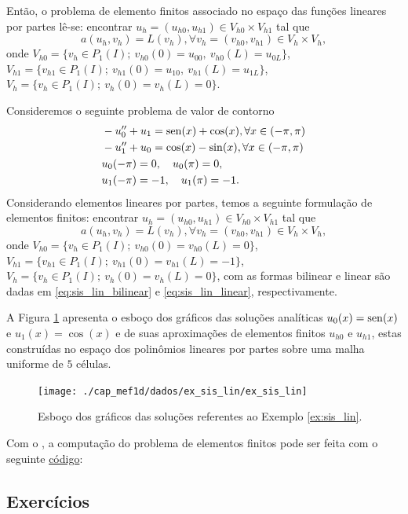 Então, o problema de elemento finitos associado no espaço das funções lineares por partes lê-se: encontrar $u_h = (u_{h0}, u_{h1})\in V_{h0}\times V_{h1}$ tal que
\begin{equation}
  a(u_h, v_h) = L(v_h), \forall v_h = (v_{h0}, v_{h1})\in V_h\times V_h,
\end{equation}
onde $V_{h0} = \{v_h\in P_1(I);~v_{h0}(0)=u_{00},~v_{h0}(L)=u_{0L}\}$, $V_{h1}=\{v_{h1}\in P_1(I);~v_{h1}(0)=u_{10},~v_{h1}(L)=u_{1L}\}$, $V_h = \{v_h\in P_1(I);~v_h(0)=v_h(L)=0\}$.

\begin{ex}\label{ex:sis_lin}
  Consideremos o seguinte problema de valor de contorno
\begin{align}
  &-u_0'' + u_1 = \operatorname{sen}(x)+\cos(x),\forall x\in (-\pi, \pi)\\ 
  &-u_1'' + u_0 = \cos(x)-\sin(x),\forall x\in (-\pi, \pi)\\
  &u_0(-\pi)=0,\quad u_0(\pi)=0,\\
  &u_1(-\pi)=-1,\quad u_1(\pi)=-1.
\end{align}
Considerando elementos lineares por partes, temos a seguinte formulação de elementos finitos: encontrar $u_h = (u_{h0}, u_{h1})\in V_{h0}\times V_{h1}$ tal que
\begin{equation}
  a(u_h, v_h) = L(v_h), \forall v_h = (v_{h0}, v_{h1})\in V_h\times V_h,
\end{equation}
onde $V_{h0} = \{v_h\in P_1(I);~v_{h0}(0)=v_{h0}(L)=0\}$, $V_{h1}=\{v_{h1}\in P_1(I);~v_{h1}(0)=v_{h1}(L)=-1\}$, $V_h = \{v_h\in P_1(I);~v_h(0)=v_h(L)=0\}$, com as formas bilinear e linear são dadas em \eqref{eq:sis_lin_bilinear} e \eqref{eq:sis_lin_linear}, respectivamente.

A Figura \ref{fig:ex_sis_lin} apresenta o esboço dos gráficos das soluções analíticas $u_0(x)=\operatorname{sen}(x)$ e $u_1(x)=\cos(x)$ e de suas aproximações de elementos finitos $u_{h0}$ e $u_{h1}$, estas construídas no espaço dos polinômios lineares por partes sobre uma malha uniforme de $5$ células.

\begin{figure}[h!]
  \centering
  \texttt{[image: ./cap\_mef1d/dados/ex\_sis\_lin/ex\_sis\_lin]}
  \caption{Esboço dos gráficos das soluções referentes ao Exemplo \ref{ex:sis_lin}.}
  \label{fig:ex_sis_lin}
\end{figure}

\ifispython
Com o \fenics, a computação do problema de elementos finitos pode ser feita com o seguinte \href{https://github.com/phkonzen/notas/blob/master/src/MetodoElementosFinitos/cap_mef1d/dados/ex_sis_lin/ex_sis_lin.py}{código}:

\fi
\end{ex}

\subsection*{Exercícios}

\emconstrucao

